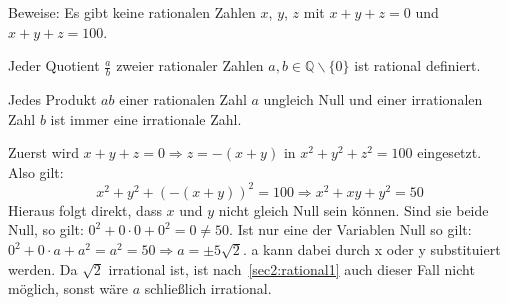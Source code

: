 \documentclass[10pt, a4paper]{amsart}
\makeatletter
\renewenvironment{proof}[1][\proofname]{\par
\pushQED{\qed}%
\normalfont \topsep6\p@\@plus6\p@\relax
\trivlist
\item\relax
{\bfseries#1}\hspace\labelsep\ignorespaces
}{%
\popQED\endtrivlist\@endpefalse
}
\newenvironment{proof thm}[1]{
\begin{proof}[\proofname~(#1)]}{\end{proof}}
\makeatother
\begin{document}
\newpage
\begin{aufgabe}
  Beweise: Es gibt keine rationalen Zahlen $x$, $y$, $z$ mit $x + y + z = 0$ und
  $x + y + z = 100$.
\end{aufgabe}
\begin{lemma}\label{sec2:rational1}
  Jeder Quotient $\frac{a}{b}$ zweier rationaler Zahlen $a,b∈ℚ\backslash\{0\}$
  ist rational definiert.
\end{lemma}
\begin{lemma}\label{sec2:rational2}
  Jedes Produkt $ ab $ einer rationalen Zahl $a$ ungleich Null und einer
  irrationalen Zahl $b$ ist immer eine irrationale Zahl.
\end{lemma}
\begin{proof}
  Zuerst wird $x+y+z = 0 \Rightarrow z = -(x+y)$ in $x^2+y^2+z^2 = 100$
  eingesetzt. Also gilt:
  \begin{equation}
    \label{eq:1}
    x^2+y^2+(-(x+y))^2 = 100 \Rightarrow x^2+xy+y^2=50
  \end{equation}
  Hieraus folgt direkt, dass $x$ und $y$ nicht gleich Null sein können. Sind sie
  beide Null, so gilt: $0^2+0\cdot0+0^2=0\neq50$. Ist nur eine der Variablen
  Null so gilt: $0^2+0\cdot a+a^2=a^2=50\Rightarrow a = \pm5\sqrt{2}$. a kann
  dabei durch x oder y substituiert werden. Da $\sqrt{2}$ irrational ist, ist
  nach~\autoref{sec2:rational1} auch dieser Fall nicht möglich, sonst wäre
  $a$ schließlich irrational.


\end{proof}
\end{document}
